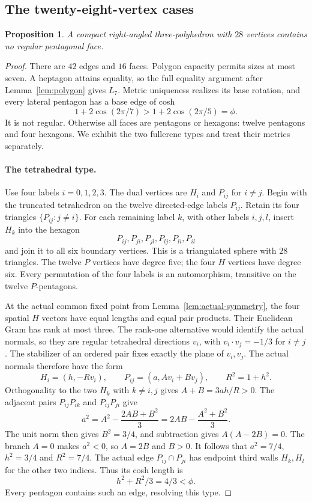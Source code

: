 \documentclass[11pt]{article}
\newtheorem{proposition}[theorem]{Proposition}
\theoremstyle{remark}
\begin{document}
\subsection{The twenty-eight-vertex cases}

\begin{proposition}\label{prop:c28}
A compact right-angled three-polyhedron with $28$ vertices contains no
regular pentagonal face.
\end{proposition}
\begin{proof}
There are $42$ edges and $16$ faces. Polygon capacity permits sizes at
most seven. A heptagon attains equality, so the full equality argument
after Lemma~\ref{lem:polygon} gives $L_7$. Metric uniqueness realizes
its base rotation, and every lateral pentagon has a base edge of cosh
\[
 1+2\cos(2\pi/7)>1+2\cos(2\pi/5)=\phi.
\]
It is not regular. Otherwise all faces are pentagons or hexagons:
twelve pentagons and four hexagons. We exhibit the two fullerene types
and treat their metrics separately.

\paragraph{The tetrahedral type.}
Use four labels $i=0,1,2,3$. The dual vertices are $H_i$ and $P_{ij}$
for $i\ne j$. Begin with the truncated tetrahedron on the twelve
directed-edge labels $P_{ij}$. Retain its four triangles
$\{P_{ij}:j\ne i\}$. For each remaining label $k$, with other labels
$i,j,l$, insert $H_k$ into the hexagon
\[
 P_{ij},P_{ji},P_{jl},P_{lj},P_{li},P_{il}
\]
and join it to all six boundary vertices. This is a triangulated
sphere with $28$ triangles. The twelve $P$ vertices have degree five;
the four $H$ vertices have degree six. Every permutation of the four
labels is an automorphism, transitive on the twelve $P$-pentagons.

At the actual common fixed point from Lemma~\ref{lem:actual-symmetry},
the four spatial $H$ vectors have equal lengths and equal pair
products. Their Euclidean Gram has rank at most three. The rank-one
alternative would identify the actual normals, so they are regular
tetrahedral directions $v_i$, with $v_i\cdot v_j=-1/3$ for $i\ne j$.
The stabilizer of an ordered pair fixes exactly the plane of $v_i,v_j$.
The actual normals therefore have the form
\[
 H_i=(h,-Rv_i),\qquad P_{ij}=(a,Av_i+Bv_j),\qquad R^2=1+h^2.
\]
Orthogonality to the two $H_k$ with $k\ne i,j$ gives $A+B=3ah/R>0$.
The adjacent pairs $P_{ij}P_{ik}$ and $P_{ij}P_{ji}$ give
\[
 a^2=A^2-\frac{2AB+B^2}{3}
     =2AB-\frac{A^2+B^2}{3}.
\]
The unit norm then gives $B^2=3/4$, and subtraction gives
$A(A-2B)=0$. The branch $A=0$ makes $a^2<0$, so $A=2B$ and $B>0$.
It follows that $a^2=7/4$, $h^2=3/4$ and $R^2=7/4$. The actual edge
$P_{ij}\cap P_{ji}$ has endpoint third walls $H_k,H_l$ for the other
two indices. Thus its cosh length is
\[
 h^2+R^2/3=4/3<\phi.
\]
Every pentagon contains such an edge, resolving this type.


\end{proof}
\end{document}
